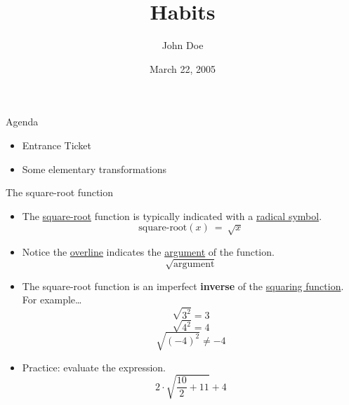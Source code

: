 \documentclass[
  ignorenonframetext,
]{beamer}
\title{Habits}
\author{John Doe}
\date{March 22, 2005}
\providecommand{\tightlist}{%
  \setlength{\itemsep}{0pt}\setlength{\parskip}{0pt}}
\begin{document}
\frame{\titlepage}

\begin{frame}{Agenda}
\protect\hypertarget{agenda}{}
\begin{itemize}
\tightlist
\item
  Entrance Ticket
\item
  Some elementary transformations
\end{itemize}
\end{frame}

\begin{frame}{The square-root function}
\protect\hypertarget{the-square-root-function}{}
\begin{itemize}
\item
  The \href{https://en.wikipedia.org/wiki/Square_root}{square-root}
  function is typically indicated with a
  \href{https://en.wikipedia.org/wiki/Radical_symbol}{radical symbol}.
  \[\text{square-root}(x) ~=~ \sqrt{x}\]
\item
  Notice the \href{https://en.wikipedia.org/wiki/Overline}{overline}
  indicates the
  \href{https://en.wikipedia.org/wiki/Argument_of_a_function}{argument}
  of the function. \[\sqrt{\mathrm{argument}}\]
\item
  The square-root function is an imperfect \textbf{inverse} of the
  \href{https://en.wikipedia.org/wiki/Square_(algebra)\#square_function}{squaring
  function}. For example\ldots{} \[\sqrt{3^2}=3\] \[\sqrt{4^2}=4\]
  \[\sqrt{(-4)^2}\ne -4\]
\item
  Practice: evaluate the expression. \[2\cdot \sqrt{\frac{10}{2}+11}+4\]
\end{itemize}
\end{frame}
\end{document}
